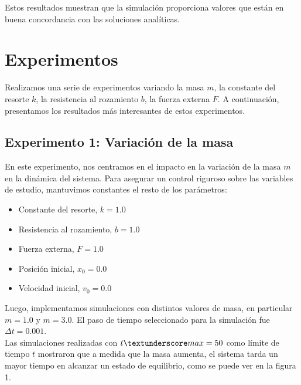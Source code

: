 \documentclass[]{article}
\begin{document}
Estos resultados muestran que la simulación proporciona valores que están en buena concordancia con las soluciones analíticas.

\section{Experimentos}
Realizamos una serie de experimentos variando la masa $m$, la constante del resorte $k$, la resistencia al rozamiento $b$, la fuerza externa $F$. A continuación, presentamos los resultados más interesantes de estos experimentos.

\subsection{Experimento 1: Variación de la masa}
En este experimento, nos centramos en el impacto en  la variación de la masa $m$ en la dinámica del sistema. Para asegurar un control riguroso sobre las variables de estudio, mantuvimos constantes el resto de los parámetros:

\begin{itemize}
\item Constante del resorte, $k = 1.0$
\item Resistencia al rozamiento, $b = 1.0$
\item Fuerza externa, $F = 1.0$
\item Posición inicial, $x_0 = 0.0$
\item Velocidad inicial, $v_0 = 0.0$
\end{itemize}

Luego, implementamos simulaciones con distintos valores de masa, en particular $m = 1.0$ y $m = 3.0$. El paso de tiempo seleccionado para la simulación fue $\Delta t= 0.001$.\\

Las simulaciones realizadas con $t\textunderscore max = 50$ como límite de tiempo $t$ mostraron que a medida que la masa aumenta, el sistema tarda un mayor tiempo en alcanzar un estado de equilibrio, como se puede ver en la figura 1.



\end{document}
